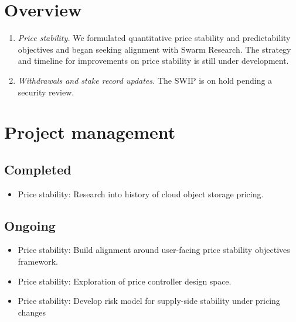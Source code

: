 \maketitle
\section*{Overview}

\begin{enumerate}
  \item \emph{Price stability.}
    We formulated quantitative price stability and predictability objectives and began seeking alignment with Swarm Research.
    The strategy and timeline for improvements on price stability is still under development.

  \item \emph{Withdrawals and stake record updates.} 
    The SWIP is on hold pending a security review.

\end{enumerate}

\section*{Project management}

\subsection*{Completed}

\begin{itemize}
  \item Price stability: Research into history of cloud object storage pricing.
\end{itemize}

\subsection*{Ongoing}

\begin{itemize}
  \item Price stability: Build alignment around user-facing price stability objectives framework. 
  \item Price stability: Exploration of price controller design space.
  \item Price stability: Develop risk model for supply-side stability under pricing changes
\end{itemize}

